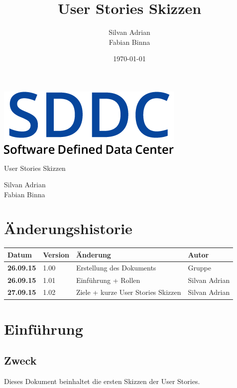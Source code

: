 \documentclass[11pt]{scrartcl}
\title{User Stories Skizzen}
\author{Silvan Adrian \\ Fabian Binna}
\date{\today{}}
\begin{document}
\def\arraystretch{1.5}
\begin{titlepage}
\begin{center}
\vspace{10em}
\includegraphics[scale=2]{SDDC}
\vspace{10em}
\end{center}
\begin{center}
\huge {User Stories Skizzen}
\end{center}
\begin{center}
\vspace{10em}
\LARGE {Silvan Adrian} \\
\LARGE {Fabian Binna}
\end{center}

\end{titlepage}

\newpage
\section{Änderungshistorie}
\begin{tabularx}{\linewidth}{l l X l}
\textbf{Datum} & \textbf{Version} & \textbf{Änderung}  & \textbf{Autor} \\
\hline
\textbf{26.09.15} & 1.00 & Erstellung des Dokuments & Gruppe \\
\textbf{26.09.15} & 1.01 & Einführung + Rollen & Silvan Adrian \\
\textbf{27.09.15} & 1.02 & Ziele + kurze User Stories Skizzen & Silvan Adrian\\
\end{tabularx}

\newpage
\tableofcontents
\newpage
\section{Einführung}

\subsection{Zweck}

Dieses Dokument beinhaltet die ersten Skizzen der User Stories.
\end{document}
